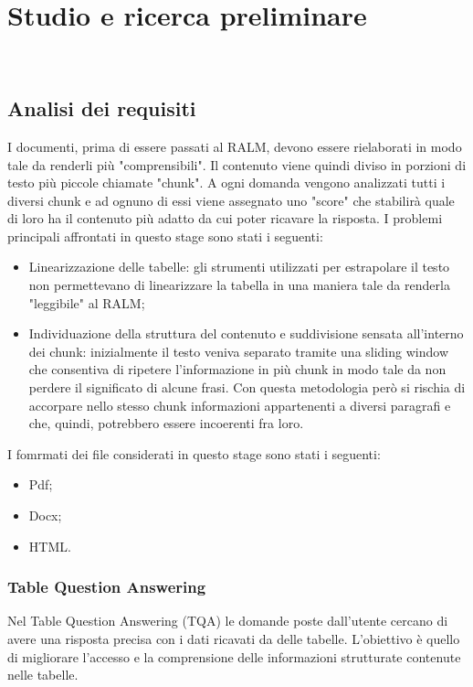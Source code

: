 \chapter{Studio e ricerca preliminare}
\label{cap:analisi preliminare}

 \\

\section{Analisi dei requisiti}
I documenti, prima di essere passati al RALM, devono essere rielaborati in modo tale da renderli più "comprensibili".
Il contenuto viene quindi diviso in porzioni di testo più piccole chiamate "chunk". A ogni domanda vengono analizzati tutti i 
diversi chunk e ad ognuno di essi viene assegnato uno "score" che stabilirà quale di loro ha il contenuto più adatto da cui 
poter ricavare la risposta.
I problemi principali affrontati in questo stage sono stati i seguenti:
\begin{itemize}
    \item Linearizzazione delle tabelle: gli strumenti utilizzati per estrapolare il testo non permettevano di linearizzare 
    la tabella in una maniera tale da renderla "leggibile" al RALM;
    \item Individuazione della struttura del contenuto e suddivisione sensata all'interno dei chunk: 
    inizialmente il testo veniva separato tramite una sliding window che consentiva di ripetere l'informazione in più chunk in modo tale da non perdere 
    il significato di alcune frasi.
    Con questa metodologia però si rischia di accorpare nello stesso chunk informazioni appartenenti a diversi paragrafi e che, quindi, potrebbero essere incoerenti fra loro.
\end{itemize}

I fomrmati dei file considerati in questo stage sono stati i seguenti:
\begin{itemize}
    \item Pdf;
    \item Docx;
    \item HTML.
\end{itemize}

\subsection{Table Question Answering}
Nel Table Question Answering (TQA) le domande poste dall'utente cercano di avere una risposta precisa con i dati ricavati da delle tabelle.
L'obiettivo è quello di migliorare l'accesso e la comprensione delle informazioni strutturate contenute nelle tabelle.

